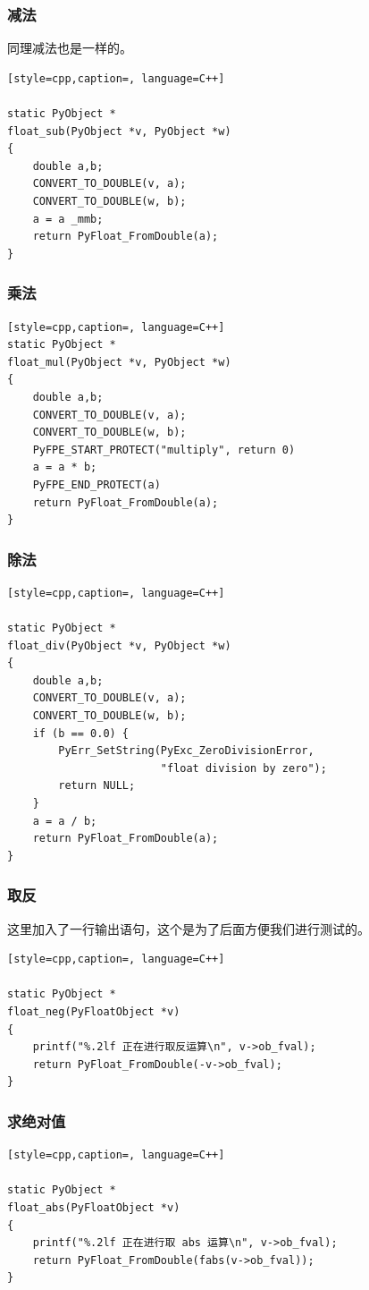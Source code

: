 \subsubsection{减法}
同理减法也是一样的。
\begin{lstlisting}[style=cpp,caption=, language=C++]

static PyObject *
float_sub(PyObject *v, PyObject *w)
{
    double a,b;
    CONVERT_TO_DOUBLE(v, a);
    CONVERT_TO_DOUBLE(w, b);
    a = a _mmb; 
    return PyFloat_FromDouble(a);
}
\end{lstlisting}
\subsubsection{乘法}
\begin{lstlisting}[style=cpp,caption=, language=C++]
static PyObject *
float_mul(PyObject *v, PyObject *w)
{
    double a,b;
    CONVERT_TO_DOUBLE(v, a);
    CONVERT_TO_DOUBLE(w, b);
    PyFPE_START_PROTECT("multiply", return 0)
    a = a * b;
    PyFPE_END_PROTECT(a)
    return PyFloat_FromDouble(a);
}
\end{lstlisting}
\subsubsection{除法}
\begin{lstlisting}[style=cpp,caption=, language=C++]

static PyObject *
float_div(PyObject *v, PyObject *w)
{
    double a,b;
    CONVERT_TO_DOUBLE(v, a);
    CONVERT_TO_DOUBLE(w, b);
    if (b == 0.0) {
        PyErr_SetString(PyExc_ZeroDivisionError,
                        "float division by zero");
        return NULL;
    }
    a = a / b;
    return PyFloat_FromDouble(a);
}
\end{lstlisting}
\subsubsection{取反}
这里加入了一行输出语句，这个是为了后面方便我们进行测试的。
\begin{lstlisting}[style=cpp,caption=, language=C++]

static PyObject *
float_neg(PyFloatObject *v)
{
    printf("%.2lf 正在进行取反运算\n", v->ob_fval);
    return PyFloat_FromDouble(-v->ob_fval);
}
\end{lstlisting}
\subsubsection{求绝对值}
\begin{lstlisting}[style=cpp,caption=, language=C++]

static PyObject *
float_abs(PyFloatObject *v)
{
    printf("%.2lf 正在进行取 abs 运算\n", v->ob_fval);
    return PyFloat_FromDouble(fabs(v->ob_fval));
}
\end{lstlisting}
